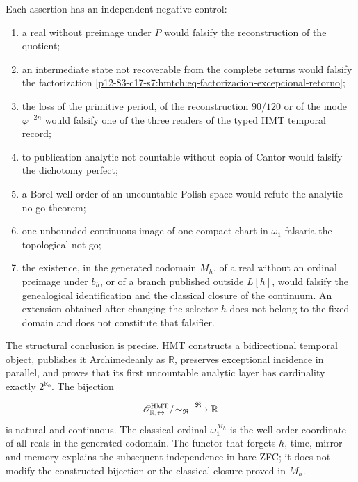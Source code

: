 \begin{proposition}[Falsifiers]
\label{p12-83-c19-s1:hmtch:prop-falsadores}
Each assertion has an independent negative control:
\begin{enumerate}
 \item a real without preimage under \(P\) would falsify the reconstruction of the
       quotient;
 \item an intermediate state not recoverable from the complete returns
       would falsify the factorization
       \eqref{p12-83-c17-s7:hmtch:eq-factorizacion-excepcional-retorno};
 \item the loss of the primitive period, of the reconstruction \(90/120\) or
       of the mode \(\varphi^{-2n}\) would falsify one of the three readers of the
       typed HMT temporal record;
 \item to publication analytic not countable without copia of Cantor would falsify
       the dichotomy perfect;
 \item a Borel well-order of an uncountable Polish space would refute the
       analytic no-go theorem;
 \item one unbounded continuous image of one compact chart in \(\omega_1\)
       falsaria the topological not-go;
 \item the existence, in the generated codomain \(M_h\), of a real without
       an ordinal preimage under \(b_h\), or of a branch published outside
       \(L[h]\), would falsify the genealogical identification and the classical closure
       of the continuum. An extension obtained after changing the selector
       \(h\) does not belong to the fixed domain and does not constitute that falsifier.
\end{enumerate}
\end{proposition}

The structural conclusion is precise. HMT constructs a bidirectional temporal
object, publishes it Archimedeanly as \(\mathbb R\), preserves exceptional
incidence in parallel, and proves that its first uncountable analytic layer
has cardinality exactly \(2^{\aleph_0}\). The bijection
\[
 \mathscr O_{\mathbb R,\leftrightarrow}^{\rm HMT}/\!
 \sim_{\mathfrak R}
 \xrightarrow{\ \overline{\mathfrak R}\ }\mathbb R
\]
is natural and continuous. The classical ordinal \(\omega_1^{M_h}\) is the well-order
coordinate of all reals in the generated codomain. The functor that
forgets \(h\), time, mirror and memory explains the subsequent independence in
bare ZFC; it does not modify the constructed bijection or the classical closure
proved in \(M_h\).
